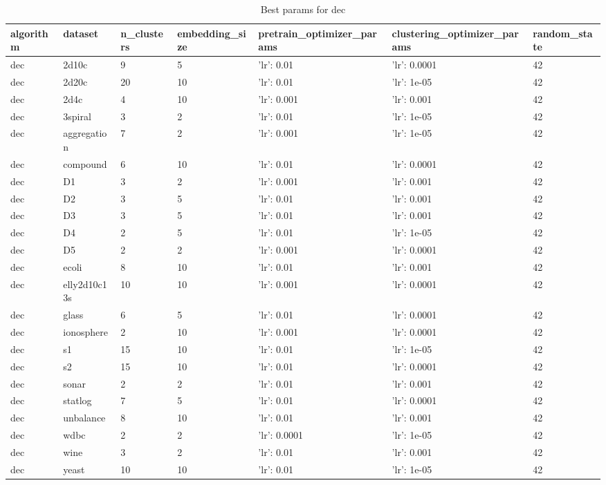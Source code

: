 \clearpage

\begin{table}[H]
\centering
\caption{Best params for dec}
\label{S15_Table}
\begin{tabular}{|l|l|l|l|l|l|l|}
\hline
algorithm & dataset & n\_clusters & embedding\_size & pretrain\_optimizer\_params & clustering\_optimizer\_params & random\_state \\
\hline
dec & 2d10c & 9 & 5 & {'lr': 0.01} & {'lr': 0.0001} & 42 \\
\hline
dec & 2d20c & 20 & 10 & {'lr': 0.01} & {'lr': 1e-05} & 42 \\
\hline
dec & 2d4c & 4 & 10 & {'lr': 0.001} & {'lr': 0.001} & 42 \\
\hline
dec & 3spiral & 3 & 2 & {'lr': 0.01} & {'lr': 1e-05} & 42 \\
\hline
dec & aggregation & 7 & 2 & {'lr': 0.001} & {'lr': 1e-05} & 42 \\
\hline
dec & compound & 6 & 10 & {'lr': 0.01} & {'lr': 0.0001} & 42 \\
\hline
dec & D1 & 3 & 2 & {'lr': 0.001} & {'lr': 0.001} & 42 \\
\hline
dec & D2 & 3 & 5 & {'lr': 0.01} & {'lr': 0.001} & 42 \\
\hline
dec & D3 & 3 & 5 & {'lr': 0.01} & {'lr': 0.001} & 42 \\
\hline
dec & D4 & 2 & 5 & {'lr': 0.01} & {'lr': 1e-05} & 42 \\
\hline
dec & D5 & 2 & 2 & {'lr': 0.001} & {'lr': 0.0001} & 42 \\
\hline
dec & ecoli & 8 & 10 & {'lr': 0.01} & {'lr': 0.001} & 42 \\
\hline
dec & elly2d10c13s & 10 & 10 & {'lr': 0.001} & {'lr': 0.0001} & 42 \\
\hline
dec & glass & 6 & 5 & {'lr': 0.01} & {'lr': 0.0001} & 42 \\
\hline
dec & ionosphere & 2 & 10 & {'lr': 0.001} & {'lr': 0.0001} & 42 \\
\hline
dec & s1 & 15 & 10 & {'lr': 0.01} & {'lr': 1e-05} & 42 \\
\hline
dec & s2 & 15 & 10 & {'lr': 0.01} & {'lr': 0.0001} & 42 \\
\hline
dec & sonar & 2 & 2 & {'lr': 0.01} & {'lr': 0.001} & 42 \\
\hline
dec & statlog & 7 & 5 & {'lr': 0.01} & {'lr': 0.0001} & 42 \\
\hline
dec & unbalance & 8 & 10 & {'lr': 0.01} & {'lr': 0.001} & 42 \\
\hline
dec & wdbc & 2 & 2 & {'lr': 0.0001} & {'lr': 1e-05} & 42 \\
\hline
dec & wine & 3 & 2 & {'lr': 0.01} & {'lr': 0.001} & 42 \\
\hline
dec & yeast & 10 & 10 & {'lr': 0.01} & {'lr': 1e-05} & 42 \\
\hline
\end{tabular}
\end{table}

